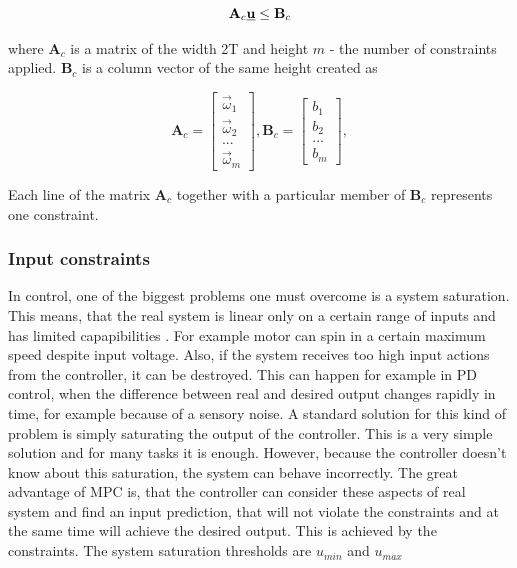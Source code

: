 \documentclass{article}
\newcommand{\uvec}{\textbf{\underline{u}}}
\begin{document}
\begin{equation}
\label{eq:MPC_cond}
\textbf{A}_c \uvec \leq \textbf{B}_c
\end{equation}


where $\textbf{A}_c$ is a matrix of the width 2T and height $m$ - the number of constraints applied. $\textbf{B}_c$ is a column vector of the same height created as

\begin{equation}
\textbf{A}_c =
  \begin{bmatrix}
  \vec{\omega}_1 \\
  \vec{\omega}_2 \\
  ...	   \\
  \vec{\omega}_m
  \end{bmatrix},\textbf{B}_c = \begin{bmatrix}
  b_1 \\
  b_2 \\
  ... \\
  b_m
  \end{bmatrix}, 
\end{equation}

Each line of the matrix $\textbf{A}_c$ together with a particular member of $\textbf{B}_c$ represents one constraint. 

\subsubsection{Input constraints}
\label{sec:input_constraints}
In control, one of the biggest problems one must overcome is a system saturation. This means, that the real system is linear only on a certain range of inputs and has limited capapibilities \cite{saturation}. For example motor can spin in a certain maximum speed despite input voltage. Also, if the system receives too high input actions from the controller, it can be destroyed. This can happen for example in PD control, when the difference between real and desired output changes rapidly in time, for example because of a sensory noise.
A standard  solution for this kind of problem is simply saturating the output of the controller. This is a very simple solution and for many tasks it is enough. However, because the controller doesn't know about this saturation, the system can behave incorrectly.
The great advantage of MPC is, that the controller can consider these aspects of real system and find an input prediction, that will not violate the constraints and at the same time will achieve the desired output. This is achieved by the constraints. The system saturation thresholds are $u_{min}$ and $u_{max}$
\end{document}
